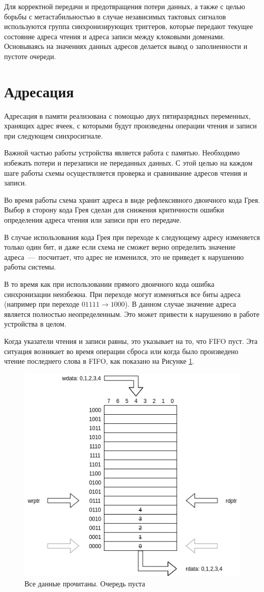 Для корректной передачи и предотвращения потери данных, а также с целью борьбы с метастабильностью в случае независимых тактовых сигналов используются группа синхронизирующих триггеров, которые передают текущее состояние адреса чтения и адреса записи между клоковыми доменами. Основываясь на значениях данных адресов делается вывод о заполненности и пустоте очереди. 

\section{Адресация}

Адресация в памяти реализована с помощью двух пятиразрядных переменных, хранящих адрес ячеек,  с которыми будут произведены операции чтения и записи при следующем синхросигнале.

Важной частью работы устройства является работа с памятью. Необходимо избежать потери и перезаписи не переданных данных. С этой целью на каждом шаге работы схемы осуществляется проверка и сравнивание адресов чтения и записи.

Во время работы схема хранит адреса в виде рефлексивного двоичного кода Грея. Выбор в сторону кода Грея сделан для снижения критичности ошибки определения адреса чтения или записи при его передаче. 

В случае использования кода Грея при переходе к следующему адресу изменяется только один бит, и даже если схема не сможет верно определить значение адреса~---~посчитает, что адрес не изменился, это не приведет к нарушению работы системы. 

В то время как при использовании прямого двоичного кода ошибка синхронизации неизбежна. При переходе могут изменяться все биты адреса (например при переходе $01111 \to 1000$). В данном случае значение адреса является полностью неопределенным. Это может привести к нарушению в работе устройства в целом.

Когда указатели чтения и записи равны, это указывает на то, что FIFO пуст. Эта ситуация возникает во время операции сброса или когда было произведено чтение последнего слова в FIFO, как показано на Рисунке \ref{fig:empty-fifo}.

\begin{figure}[h!]
	\centering
	\includegraphics[width=0.7\linewidth]{course-scheme/images/empty-fifo}
	\caption{Все данные прочитаны. Очередь пуста}
	\label{fig:empty-fifo}
\end{figure}


